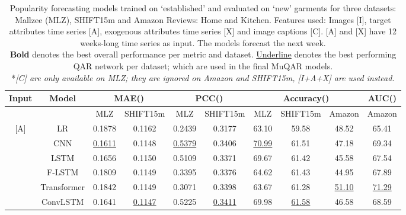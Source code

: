 \documentclass{article}
\begin{document}
\begin{table*}
\footnotesize
\centering
  \caption{Popularity forecasting models trained on `established' and evaluated on `new' garments for three datasets: Mallzee (MLZ), SHIFT15m and Amazon Reviews: Home and Kitchen.
  Features used: Images [I], target attributes time series [A], exogenous attributes time series [X] and image captions [C].
  [A] and [X] have 12 weeks-long time series as input. 
  The models forecast the next week. \\
  \textbf{Bold} denotes the best overall performance per metric and dataset. 
  \underline{Underline} denotes the best performing QAR network per dataset; which are used in the final MuQAR models. \\
  *\textit{[C] are only available on MLZ; they are ignored on Amazon and SHIFT15m, [I+A+X] are used instead.}
  }
  \label{tab:results_ablation}
  \begin{tabular}{cc|cc|cc|ccc|c}
    \toprule
     \multicolumn{1}{c}{\textbf{Input}} & 
     \multicolumn{1}{c}{\textbf{Model}} & 
     \multicolumn{2}{c}{\textbf{MAE() }} & 
     \multicolumn{2}{c}{\textbf{PCC() }} & 
     \multicolumn{3}{c}{\textbf{Accuracy() }} &
     \multicolumn{1}{c}{\textbf{AUC() }} 
     \\
     
    \midrule
    
    && MLZ & SHIFT15m & MLZ & SHIFT15m & MLZ & SHIFT15m & Amazon & Amazon\\
    
    \midrule
    
    \multirow{6}{*}{[A]} &
    LR & 0.1878 & 0.1162 & 0.2439 & 0.3177 & 63.10 & 59.58 & 48.52 & 65.41 \\
    
    &
    CNN & \underline{0.1611} & 0.1148 & \underline{0.5379} & 0.3406 & \underline{70.99} & 61.51 & 47.18 & 69.34 \\
    
    &
    LSTM & 0.1656 & 0.1150 & 0.5109 & 0.3371 & 69.67 & 61.42 & 45.58 & 67.54 \\
    
    &
    F-LSTM & 0.1809 & 0.1149 & 0.3395 & 0.3376 & 64.62 & 61.43 & 44.95 & 67.89 \\
    
    &
    Transformer & 0.1842 & 0.1149 & 0.3071 & 0.3398 & 63.67 & 61.28 & \underline{51.10} & \underline{71.29} \\
    
    &
    ConvLSTM & 0.1641 & \underline{0.1147} & 0.5225 & \underline{0.3411} & 69.98 & \underline{61.58} & 46.58 & 68.59 \\
    

\end{tabular}
\end{table*}
\end{document}
